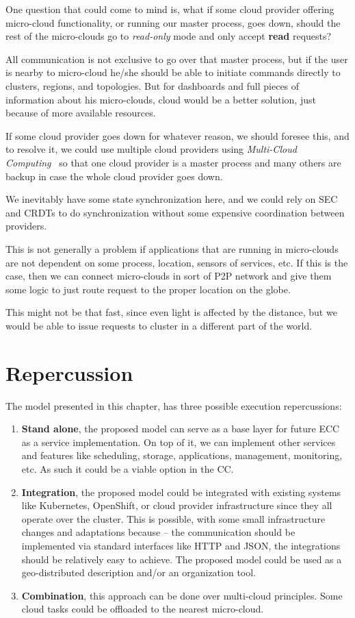 One question that could come to mind is, what if some cloud provider offering micro-cloud functionality, or running our master process, goes down, should the rest of the micro-clouds go to \textit{read-only} mode and only accept \textbf{read} requests?

All communication is not exclusive to go over that master process, but if the user is nearby to micro-cloud he/she should be able to initiate commands directly to clusters, regions, and topologies. But for dashboards and full pieces of information about his micro-clouds, cloud would be a better solution, just because of more available resources.

If some cloud provider goes down for whatever reason, we should foresee this, and to resolve it, we could use multiple cloud providers using \textit{Multi-Cloud Computing}~\cite{HongDSH19, Ardagna15} so that one cloud provider is a master process and many others are backup in case the whole cloud provider goes down.

We inevitably have some state synchronization here, and we could rely on SEC and CRDTs to do synchronization without some expensive coordination between providers.

This is not generally a problem if applications that are running in micro-clouds are not dependent on some process, location, sensors of services, etc. If this is the case, then we can connect micro-clouds in sort of P2P network and give them some logic to just route request to the proper location on the globe. 

This might not be that fast, since even light is affected by the distance, but we would be able to issue requests to cluster in a different part of the world.
%
%
\section{Repercussion}\label{sec:repercussion}
%
The model presented in this chapter, has three possible execution repercussions:

\begin{enumerate}[start=1,label={(\bfseries \arabic*)}]
	\item \textbf{Stand alone}, the proposed model can serve as a base layer for future ECC as a service implementation. On top of it, we can implement other services and features like scheduling, storage, applications, management, monitoring, etc. As such it could be a viable option in the CC.
	\item \textbf{Integration}, the proposed model could be integrated with existing systems like Kubernetes, OpenShift, or cloud provider infrastructure since they all operate over the cluster. This is possible, with some small infrastructure changes and adaptations because -- the communication should be implemented via standard interfaces like HTTP and JSON, the integrations should be relatively easy to achieve. The proposed model could be used as a geo-distributed description and/or an organization tool.
	\item \textbf{Combination}, this approach can be done over multi-cloud principles. Some cloud tasks could be offloaded to the nearest micro-cloud.
\end{enumerate} 
%
%
